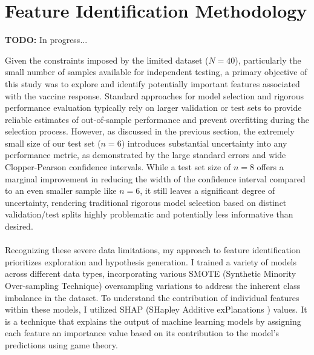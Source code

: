 \documentclass[12pt,a4paper]{report}
\newcommand{\todo}[1]{%
  \par\noindent%
  \begin{tcolorbox}[colback=yellow, colframe=black, boxrule=0.5pt, sharp corners, width=\linewidth, before skip=5pt, after skip=5pt]
    \textbf{TODO:} #1
  \end{tcolorbox}%
  \par
}
\begin{document}
\section{Feature Identification Methodology}
\todo{In progress...}
\noindent
Given the constraints imposed by the limited dataset ($N=40$), particularly the small number of samples available for independent testing, a primary objective of this study was to explore and identify potentially important features associated with the vaccine response. Standard approaches for model selection and rigorous performance evaluation typically rely on larger validation or test sets to provide reliable estimates of out-of-sample performance and prevent overfitting during the selection process. However, as discussed in the previous section, the extremely small size of our test set ($n=6$) introduces substantial uncertainty into any performance metric, as demonstrated by the large standard errors and wide Clopper-Pearson confidence intervals. While a test set size of $n=8$ offers a marginal improvement in reducing the width of the confidence interval compared to an even smaller sample like $n=6$, it still leaves a significant degree of uncertainty, rendering traditional rigorous model selection based on distinct validation/test splits highly problematic and potentially less informative than desired.\\
\\
Recognizing these severe data limitations, my approach to feature identification prioritizes exploration and hypothesis generation. I trained a variety of models across different data types, incorporating various SMOTE (Synthetic Minority Over-sampling Technique) oversampling variations to address the inherent class imbalance in the dataset. To understand the contribution of individual features within these models, I utilized SHAP (SHapley Additive exPlanations \cite{ApprouchForModelPredictions}) values. It is a technique that explains the output of machine learning models by assigning each feature an importance value based on its contribution to the model’s predictions using game theory.
\end{document}
